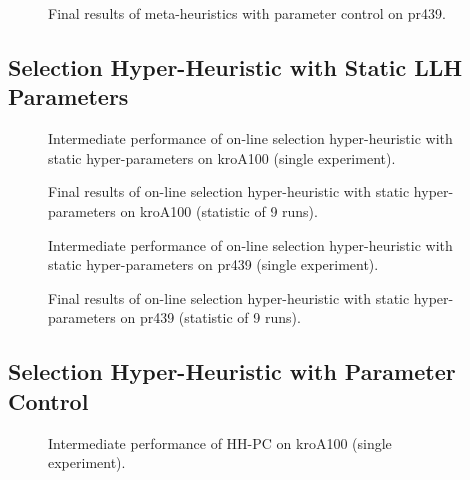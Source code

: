 \begin{figure}[h]
	\centering
	
	\caption{Final results of meta-heuristics with parameter control on pr439.}
	\label{app:eval:1:pc:pr439 final}
\end{figure}


\subsection{Selection Hyper-Heuristic with Static LLH Parameters}\label{app:eval:hh-sp}
\begin{figure}[h]
	\centering
	
	\caption{Intermediate performance of on-line selection hyper-heuristic with static hyper-parameters on kroA100 (single experiment).}
	\label{app:eval:1:hh-sp:kroA100 intermediate}
\end{figure}

\begin{figure}[h]
	\centering
	
	\caption{Final results of on-line selection hyper-heuristic with static hyper-parameters on kroA100 (statistic of 9 runs).}
	\label{app:eval:1:hh-sp:kroA100 final}
\end{figure}

\begin{figure}[h]
	\centering
	
	\caption{Intermediate performance of on-line selection hyper-heuristic with static hyper-parameters on pr439 (single experiment).}
	\label{app:eval:1:hh-sp:pr439 intermediate}
\end{figure}

\begin{figure}[h]
	\centering
	
	\caption{Final results of on-line selection hyper-heuristic with static hyper-parameters on pr439 (statistic of 9 runs).}
	\label{app:eval:1:hh-sp:pr439 final}
\end{figure}

\subsection{Selection Hyper-Heuristic with Parameter Control}\label{app:eval:hh-pc}
\begin{figure}[t]
	\centering
	
	\caption{Intermediate performance of HH-PC on kroA100 (single experiment).}
	\label{app:eval:1:hh-pc:kroA100 intermediate}
\end{figure}

